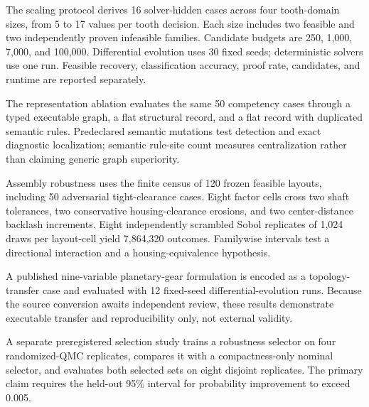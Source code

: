 \documentclass[preprint,12pt]{elsarticle}
\begin{document}
The scaling protocol derives 16 solver-hidden cases across four tooth-domain sizes, from 5 to 17 values per tooth decision. Each size includes two feasible and two independently proven infeasible families. Candidate budgets are 250, 1,000, 7,000, and 100,000. Differential evolution uses 30 fixed seeds; deterministic solvers use one run. Feasible recovery, classification accuracy, proof rate, candidates, and runtime are reported separately.

The representation ablation evaluates the same 50 competency cases through a typed executable graph, a flat structural record, and a flat record with duplicated semantic rules. Predeclared semantic mutations test detection and exact diagnostic localization; semantic rule-site count measures centralization rather than claiming generic graph superiority.

Assembly robustness uses the finite census of 120 frozen feasible layouts, including 50 adversarial tight-clearance cases. Eight factor cells cross two shaft tolerances, two conservative housing-clearance erosions, and two center-distance backlash increments. Eight independently scrambled Sobol replicates of 1,024 draws per layout-cell yield 7,864,320 outcomes. Familywise intervals test a directional interaction and a housing-equivalence hypothesis.

A published nine-variable planetary-gear formulation is encoded as a topology-transfer case and evaluated with 12 fixed-seed differential-evolution runs. Because the source conversion awaits independent review, these results demonstrate executable transfer and reproducibility only, not external validity.

A separate preregistered selection study trains a robustness selector on four randomized-QMC replicates, compares it with a compactness-only nominal selector, and evaluates both selected sets on eight disjoint replicates. The primary claim requires the held-out 95\% interval for probability improvement to exceed 0.005.
\end{document}
